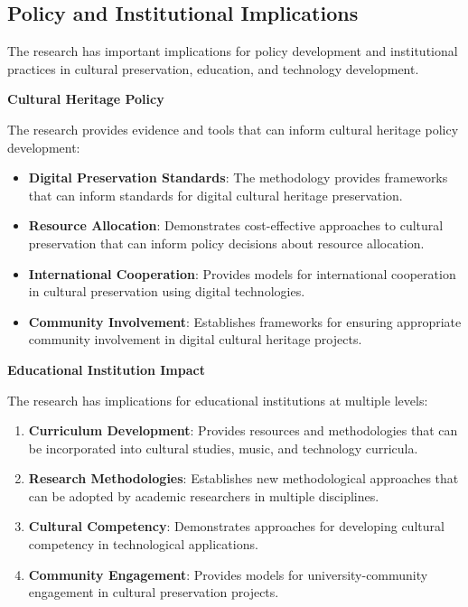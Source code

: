 \documentclass[12pt,a4paper]{article}
\begin{document}
\subsection{Policy and Institutional Implications}

The research has important implications for policy development and institutional practices in cultural preservation, education, and technology development.

\textbf{Cultural Heritage Policy}

The research provides evidence and tools that can inform cultural heritage policy development:

\begin{itemize}
\item \textbf{Digital Preservation Standards}: The methodology provides frameworks that can inform standards for digital cultural heritage preservation.
\item \textbf{Resource Allocation}: Demonstrates cost-effective approaches to cultural preservation that can inform policy decisions about resource allocation.
\item \textbf{International Cooperation}: Provides models for international cooperation in cultural preservation using digital technologies.
\item \textbf{Community Involvement}: Establishes frameworks for ensuring appropriate community involvement in digital cultural heritage projects.
\end{itemize}

\textbf{Educational Institution Impact}

The research has implications for educational institutions at multiple levels:

\begin{enumerate}
\item \textbf{Curriculum Development}: Provides resources and methodologies that can be incorporated into cultural studies, music, and technology curricula.
\item \textbf{Research Methodologies}: Establishes new methodological approaches that can be adopted by academic researchers in multiple disciplines.
\item \textbf{Cultural Competency}: Demonstrates approaches for developing cultural competency in technological applications.
\item \textbf{Community Engagement}: Provides models for university-community engagement in cultural preservation projects.
\end{enumerate}
\end{document}
